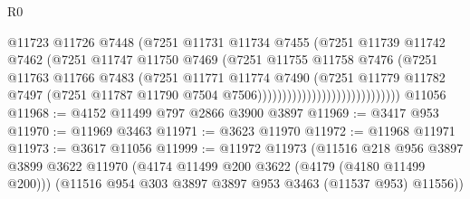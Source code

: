 \begin{lexlean}{R0}
\begin{coremodule}
                                              @11723
                                              @11726
                                              @7448
                                              (@7251
                                                @11731
                                                @11734
                                                @7455
                                                (@7251
                                                  @11739
                                                  @11742
                                                  @7462
                                                  (@7251
                                                    @11747
                                                    @11750
                                                    @7469
                                                    (@7251
                                                      @11755
                                                      @11758
                                                      @7476
                                                      (@7251
                                                        @11763
                                                        @11766
                                                        @7483
                                                        (@7251
                                                          @11771
                                                          @11774
                                                          @7490
                                                          (@7251
                                                            @11779
                                                            @11782
                                                            @7497
                                                            (@7251
                                                              @11787
                                                              @11790
                                                              @7504
                                                              @7506)))))))))))))))))))))))))))))
    @11056
@11968 := @4152 @11499 @797 @2866 @3900 @3897
@11969 := @3417 @953
@11970 := @11969 @3463
@11971 := @3623 @11970
@11972 := @11968 @11971
@11973 := @3617 @11056
@11999 := @11972
    @11973
    (@11516
      @218
      @956
      @3897
      @3899
      @3622
      @11970
      (@4174 @11499 @200 @3622 (@4179 (@4180 @11499 @200)))
      (@11516 @954 @303 @3897 @3897 @953 @3463 (@11537 @953) @11556))

\end{coremodule}
\end{lexlean}

